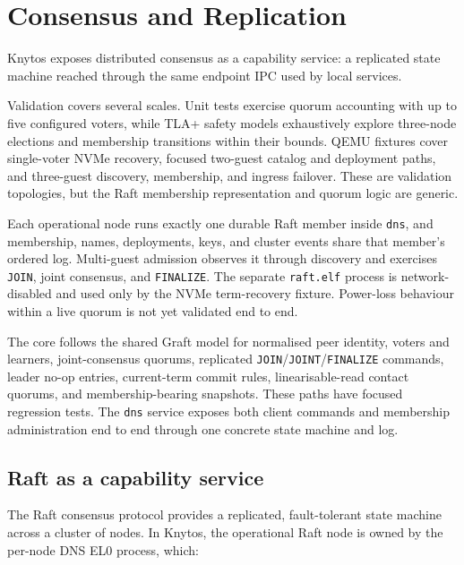 \chapter{Consensus and Replication}
\label{chap:consensus}

Knytos exposes distributed consensus as a capability service: a replicated
state machine reached through the same endpoint IPC used by local services.

Validation covers several scales. Unit tests exercise quorum accounting with
up to five configured voters, while TLA+ safety models exhaustively explore
three-node elections and membership transitions within their bounds. QEMU
fixtures cover single-voter NVMe recovery, focused two-guest catalog and
deployment paths, and three-guest discovery, membership, and ingress failover.
These are validation topologies, but the Raft membership representation and quorum
logic are generic.

Each operational node runs exactly one durable Raft member inside
\texttt{dns}, and membership, names, deployments, keys, and cluster events share
that member's ordered log. Multi-guest admission observes it through discovery
and exercises \texttt{JOIN}, joint consensus, and \texttt{FINALIZE}. The separate
\texttt{raft.elf} process is network-disabled and used only by the NVMe
term-recovery fixture. Power-loss behaviour within a live quorum is not yet
validated end to end.

The core follows the shared Graft model for
normalised peer identity, voters and learners, joint-consensus quorums,
replicated \texttt{JOIN}/\texttt{JOINT}/\texttt{FINALIZE} commands, leader
no-op entries, current-term commit rules, linearisable-read contact quorums,
and membership-bearing snapshots. These paths have focused regression tests. The
\texttt{dns} service exposes both client commands and membership
administration end to end through one concrete state machine and log.

\section{Raft as a capability service}

The Raft consensus protocol provides a replicated, fault-tolerant state machine
across a cluster of nodes. In Knytos, the operational Raft node is owned
by the per-node DNS EL0 process, which:

